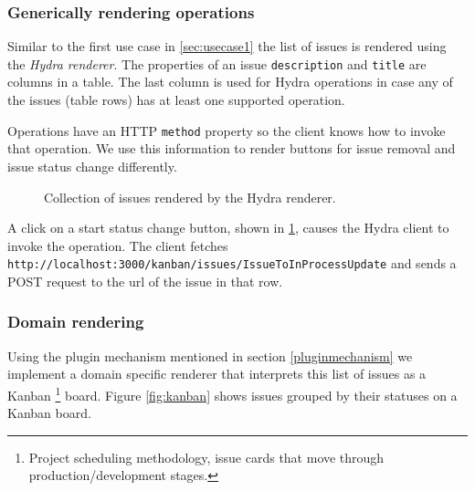 \subsubsection{Generically rendering operations}
Similar to the first use case in \ref{sec:usecase1} the list of issues is rendered using the \textit{Hydra renderer}. The properties of an issue \lstinline{description} and \lstinline{title} are columns in a table. The last column is used for Hydra operations in case any of the issues (table rows) has at least one supported operation.

Operations have an HTTP \lstinline{method} property so the client knows how to invoke that operation. We use this information to render buttons for issue removal and issue status change differently.

\begin{figure}[!htb]
  \caption{Collection of issues rendered by the Hydra renderer.}
  \label{fig:issueshydra}
\end{figure}

A click on a start status change button, shown in \ref{fig:issueshydra}, causes the Hydra client to invoke the operation. The client fetches \lstinline{http://localhost:3000/kanban/issues/IssueToInProcessUpdate} and sends a POST request to the \gls{url} of the issue in that row.

\subsubsection{Domain rendering}
Using the plugin mechanism mentioned in section \ref{pluginmechanism} we implement a domain specific renderer that interprets this list of issues as a Kanban \footnote{Project scheduling methodology, issue cards that move through production/development stages.} board. Figure \ref{fig:kanban} shows issues grouped by their statuses on a Kanban board.

